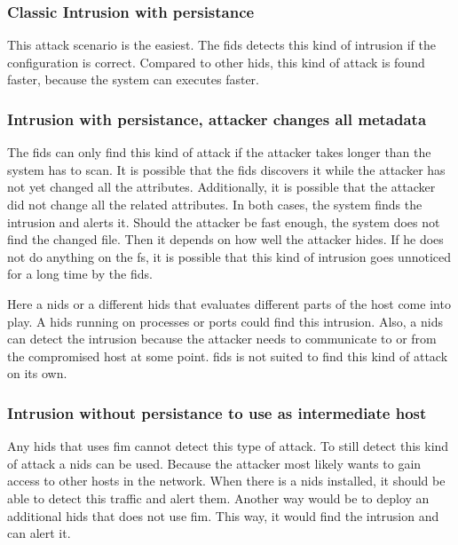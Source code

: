 \subsubsection{Classic Intrusion with persistance}
\label{sec:defense:classic}

This attack scenario is the easiest. The \gls{fids} detects this kind of \gls{intrusion} if the configuration is correct. Compared to other \gls{hids}, this kind of attack is found faster, because the system can executes faster. 

\subsubsection{Intrusion with persistance, attacker changes all metadata}
\label{sec:defense:changeattr}

The \gls{fids} can only find this kind of attack if the attacker takes longer than the system has to scan. It is possible that the \gls{fids} discovers it while the attacker has not yet changed all the attributes. Additionally, it is possible that the attacker did not change all the related attributes. In both cases, the system finds the \gls{intrusion} and alerts it. Should the attacker be fast enough, the system does not find the changed file. Then it depends on how well the attacker hides. If he does not do anything on the \gls{fs}, it is possible that this kind of \gls{intrusion} goes unnoticed for a long time by the \gls{fids}. 

Here a \gls{nids} or a different \gls{hids} that evaluates different parts of the host come into play. A \gls{hids} running on processes or ports could find this \gls{intrusion}. Also, a \gls{nids} can detect the \gls{intrusion} because the attacker needs to communicate to or from the compromised host at some point. \gls{fids} is not suited to find this kind of attack on its own.

\subsubsection{Intrusion without persistance to use as intermediate host}
\label{sec:defense:nopersistanceintermediatehost}

Any \gls{hids} that uses \gls{fim} cannot detect this type of attack. To still detect this kind of attack a \gls{nids} can be used. Because the attacker most likely wants to gain access to other hosts in the network. When there is a \gls{nids} installed, it should be able to detect this traffic and alert them. Another way would be to deploy an additional \gls{hids} that does not use \gls{fim}. This way, it would find the \gls{intrusion} and can alert it.

